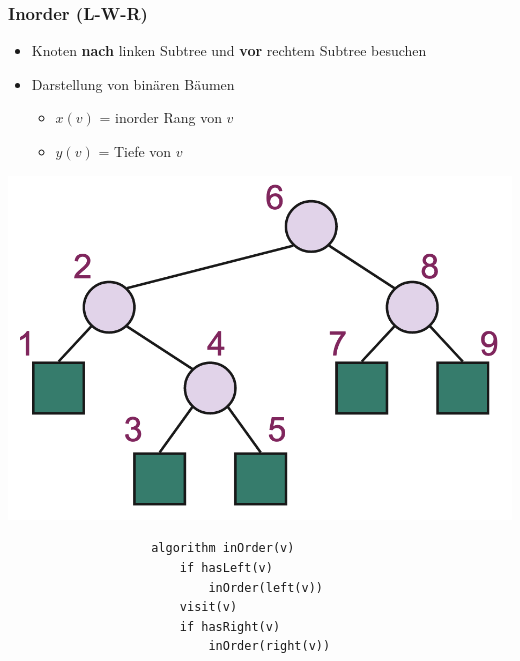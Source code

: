 \documentclass[a4paper, landscape, 8pt]{scrartcl}
\begin{document}
\begin{multicols*}{4}
                \subsubsection{Inorder (L-W-R)}
                    \begin{itemize}
                        \item Knoten {\bfseries nach} linken Subtree und {\bfseries vor} rechtem Subtree besuchen
                        \item Darstellung von binären Bäumen
                        \begin{itemize}
                            \item $x(v)$ = inorder Rang von $v$
                            \item $y(v)$ = Tiefe von $v$
                        \end{itemize}
                    \end{itemize}
                    \includegraphics[scale=0.14]{graphic/13_baum_traversierung_inorder}
                    \begin{lstlisting}
                    algorithm inOrder(v)
                        if hasLeft(v)
                            inOrder(left(v))
                        visit(v)
                        if hasRight(v)
                            inOrder(right(v))
                    \end{lstlisting}



\end{multicols*}
\end{document}
